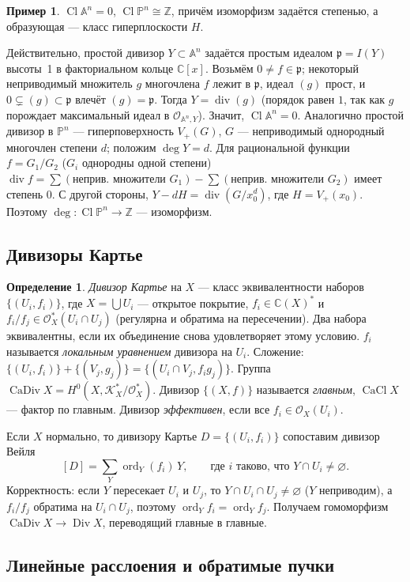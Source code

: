\documentclass[11pt,a4paper]{article}
\theoremstyle{plain}
\theoremstyle{definition}
\newtheorem{definition}[theorem]{Определение}
\newtheorem{example}[theorem]{Пример}
\theoremstyle{remark}
\renewcommand{\C}{\mathbb{C}}
\newcommand{\Z}{\mathbb{Z}}
\newcommand{\PP}{\mathbb{P}}
\newcommand{\A}{\mathbb{A}}
\newcommand{\cO}{\mathcal{O}}
\newcommand{\cK}{\mathcal{K}}
\newcommand{\pp}{\mathfrak{p}}
\DeclareMathOperator{\Cl}{Cl}
\DeclareMathOperator{\Div}{Div}
\DeclareMathOperator{\CaDiv}{CaDiv}
\DeclareMathOperator{\CaCl}{CaCl}
\DeclareMathOperator{\divv}{div}
\DeclareMathOperator{\ord}{ord}
\begin{document}
\begin{example}\label{ex:ClPn}
$\Cl\A^n=0$, $\Cl\PP^n\cong\Z$, причём изоморфизм задаётся степенью, а образующая --- класс
гиперплоскости $H$.

Действительно, простой дивизор $Y\subset\A^n$ задаётся простым идеалом $\pp=I(Y)$ высоты~1 в
факториальном кольце $\C[x]$. Возьмём $0\ne f\in\pp$; некоторый неприводимый множитель $g$ многочлена
$f$ лежит в $\pp$, идеал $(g)$ прост, и $0\subsetneq (g)\subset\pp$ влечёт $(g)=\pp$. Тогда
$Y=\divv(g)$ (порядок равен $1$, так как $g$ порождает максимальный идеал в $\cO_{\A^n,Y}$).
Значит, $\Cl\A^n=0$. Аналогично простой дивизор в $\PP^n$ --- гиперповерхность $V_+(G)$,
$G$ --- неприводимый однородный многочлен степени $d$; положим $\deg Y=d$. Для рациональной
функции $f=G_1/G_2$ ($G_i$ однородны одной степени) $\divv f=\sum(\text{неприв. множители }G_1)
-\sum(\text{неприв. множители }G_2)$ имеет степень $0$. С другой стороны,
$Y-dH=\divv(G/x_0^d)$, где $H=V_+(x_0)$. Поэтому $\deg\colon\Cl\PP^n\to\Z$ --- изоморфизм.
\end{example}

\subsection{Дивизоры Картье}

\begin{definition}
\emph{Дивизор Картье} на $X$ --- класс эквивалентности наборов $\{(U_i,f_i)\}$, где
$X=\bigcup U_i$ --- открытое покрытие, $f_i\in\C(X)^*$ и $f_i/f_j\in\cO^*_X(U_i\cap U_j)$ (регулярна
и обратима на пересечении). Два набора эквивалентны, если их объединение снова удовлетворяет этому
условию. $f_i$ называется \emph{локальным уравнением} дивизора на $U_i$. Сложение:
$\{(U_i,f_i)\}+\{(V_j,g_j)\}=\{(U_i\cap V_j,f_ig_j)\}$. Группа $\CaDiv X=H^0(X,\cK^*_X/\cO^*_X)$.
Дивизор $\{(X,f)\}$ называется \emph{главным}, $\CaCl X$ --- фактор по главным.
Дивизор \emph{эффективен}, если все $f_i\in\cO_X(U_i)$.
\end{definition}

Если $X$ нормально, то дивизору Картье $D=\{(U_i,f_i)\}$ сопоставим дивизор Вейля
\[
[D]=\sum_Y \ord_Y(f_i)\,Y,\qquad\text{где $i$ таково, что $Y\cap U_i\neq\varnothing$}.
\]
Корректность: если $Y$ пересекает $U_i$ и $U_j$, то $Y\cap U_i\cap U_j\neq\varnothing$
($Y$ неприводим), а $f_i/f_j$ обратима на $U_i\cap U_j$, поэтому $\ord_Y f_i=\ord_Y f_j$.
Получаем гомоморфизм $\CaDiv X\to\Div X$, переводящий главные в главные.

\subsection{Линейные расслоения и обратимые пучки}
\end{document}
